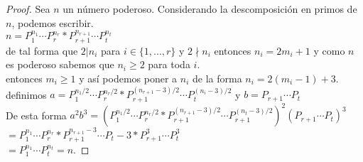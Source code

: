 \documentclass[12pt,oneside]{article}
\begin{document}
\begin{proof}
Sea $n$ un n\'umero poderoso. Considerando la descomposici\'on en primos de $n$, podemos escribir.\\
$n = P_1^{n_1} \cdots P_r^{n_r} * P_{r+1}^{n_{r+1}} \cdots P_t^{n_t}$\\
de tal forma que $2|n_i$ para $i \in \{1,...,r\}$ y $2 \nmid n_i$ entonces $n_i = 2m_i + 1$ y como $n$ es poderoso sabemos que $n_i \geq 2$ para toda $i$.\\
entonces $m_i \geq 1$ y as\'i podemos poner a $n_i$ de la forma $n_i = 2(m_i -1)+3$.\\
definimos $a = P_1^{n_1/2} \cdots P_r^{n_r/2} * P_{r+1}^{(n_{r+1}-3)/2} \cdots P_t^{(n_i - 3)/2}$ y $b = P_{r+1} \cdots P_t$\\
De esta forma $a^2b^3 = (P_1^{n_1/2} \cdots P_r^{n_r/2} * P_{r+1}^{(n_{r+1}-3)/2} \cdots
P_{r+1}^{(n_{t}-3)/2})^2 (P_{r+1} \cdots P_t)^3$\\
$= P_1^{n_1} \cdots P_r^{n_r} * P_{r+1}^{n_{r+1}-3} \cdots P_t - 3 * P_{r+1}^3 \cdots P_t^3$\\
$= P_1^{n_1} \cdots P_t^{n_t} = n$.
\end{proof}
\end{document}
